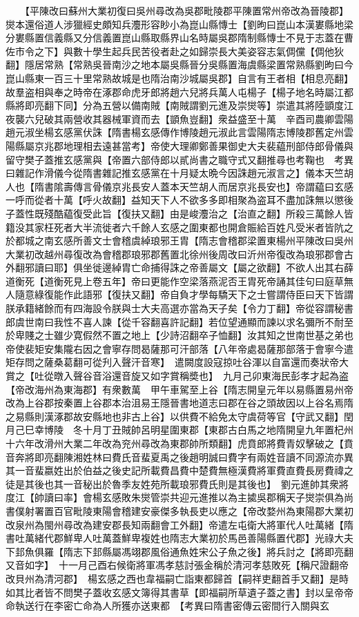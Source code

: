 　　【平陳改曰蘇州大業初復曰吳州尋改為吳郡毗陵郡平陳置常州帝改為晉陵郡】爕本還俗道人涉獵經史頗知兵灋形容眇小為崑山縣慱士【劉昫曰崑山本漢婁縣地梁分婁縣置信義縣又分信義置崑山縣取縣界山名時屬吳郡隋制縣慱士不見于志蓋在曹佐市令之下】與數十學生起兵民苦役者赴之如歸崇長大美姿容志氣倜儻【倜他狄翻】隱居常熟【常熟吳晉南沙之地本屬吳縣晉分吳縣置海虞縣梁置常熟縣劉昫曰今崑山縣東一百三十里常熟故城是也隋治南沙城屬吳郡】自言有王者相【相息亮翻】故羣盗相與奉之時帝在涿郡命虎牙郎將趙六兒將兵萬人屯楊子【楊子地名時屬江都縣將即亮翻下同】分為五營以備南賊【南賊謂劉元進及崇爕等】崇遣其將陸顗度江夜襲六兒破其兩營收其器械軍資而去【顗魚豈翻】衆益盛至十萬　辛酉司農卿雲陽趙元淑坐楊玄感黨伏誅【隋書楊玄感傳作博陵趙元淑此言雲陽隋志博陵郡舊定州雲陽縣屬京兆郡地理相去遠甚當考】帝使大理卿鄭善果御史大夫裴藴刑部侍郎骨儀與留守樊子蓋推玄感黨與【帝置六部侍郎以貳尚書之職守式又翻推尋也考鞠也　考異曰雜記作滑儀今從隋書雜記推玄感黨在十月疑太晩今因誅趙元淑言之】儀本天竺胡人也【隋書隂壽傳言骨儀京兆長安人蓋本天竺胡人而居京兆長安也】帝謂藴曰玄感一呼而從者十萬【呼火故翻】益知天下人不欲多多即相聚為盗耳不盡加誅無以懲後子蓋性既殘酷藴復受此旨【復扶又翻】由是峻灋治之【治直之翻】所殺三萬餘人皆籍没其家枉死者大半流徙者六千餘人玄感之圍東都也開倉賑給百姓凡受米者皆阬之於都城之南玄感所善文士會稽虞綽琅邪王胄【隋志會稽郡梁置東楊州平陳改曰吳州大業初改越州尋復改為會稽郡琅邪郡舊置北徐州後周改曰沂州帝復改為琅邪郡會古外翻邪讀曰耶】俱坐徙邊綽胄亡命捕得誅之帝善屬文【屬之欲翻】不欲人出其右薛道衡死【道衡死見上卷五年】帝曰更能作空梁落燕泥否王胄死帝誦其佳句曰庭草無人隨意綠復能作此語邪【復扶又翻】帝自負才學每驕天下之士嘗謂侍臣曰天下皆謂朕承籍緒餘而有四海設令朕與士大夫高選亦當為天子矣【令力丁翻】帝從容謂秘書郎虞世南曰我性不喜人諫【從千容翻喜許記翻】若位望通顯而諫以求名彌所不耐至於卑賤之士雖少寛假然不置之地上【少詩沼翻卒子恤翻】汝其知之世南世基之弟也　帝使裴矩安集隴右因之會寧存問曷薩那可汗部落【八年帝處曷薩那部落于會寧今遣矩存問之薩桑葛翻可從刋入聲汗音寒】　遣闕度設寇掠吐谷渾以自富還而奏狀帝大賞之【吐從暾入聲谷音浴還音旋又如字賞稱奬也】　九月己卯東海民彭孝才起為盗【帝改海州為東海郡】有衆數萬　甲午車駕至上谷【隋志開皇元年以易縣置易州帝改為上谷郡按秦置上谷郡本治沮易王隱晉書地道志曰郡在谷之頭故因以上谷名焉隋之易縣則漢涿郡故安縣地也非古上谷】以供費不給免太守虞荷等官【守武又翻】閏月己巳幸博陵　冬十月丁丑賊帥呂明星圍東郡【東郡古白馬之地隋開皇九年置杞州十六年改滑州大業二年改為兖州尋改為東郡帥所類翻】虎賁郎將費青奴擊破之【賁音奔將即亮翻陳湘姓林曰費氏音蜚夏禹之後趙明誠曰費字有兩姓音讀不同源流亦異其一音蜚嬴姓出於伯益之後史記所載費昌費中楚費無極漢費將軍費直費長房費禕之徒是其後也其一音秘出於魯季友姓苑所載琅邪費氏則是其後也】　劉元進帥其衆將度江【帥讀曰率】會楊玄感敗朱爕管崇共迎元進推以為主㨿吳郡稱天子爕崇俱為尚書僕射署置百官毗陵東陽會稽建安豪傑多執長吏以應之【帝改婺州為東陽郡大業初改泉州為閩州尋改為建安郡長知兩翻會工外翻】帝遣左屯衛大將軍代人吐萬緒【隋書吐萬緒代郡鮮卑人吐萬蓋鮮卑複姓也隋志大業初於馬邑善陽縣置代郡】光祿大夫下邽魚俱羅【隋志下邽縣屬馮翊郡風俗通魚姓宋公子魚之後】將兵討之【將即亮翻又音如字】　十一月己酉右候衛將軍馮孝慈討張金稱於清河孝慈敗死【稱尺證翻帝改貝州為清河郡】　楊玄感之西也韋福嗣亡詣東都歸首【嗣祥吏翻首手又翻】是時如其比者皆不問樊子蓋收玄感文簿得其書草【即福嗣所草遺子蓋之書】封以呈帝帝命執送行在李密亡命為人所獲亦送東都　【考異曰隋書密傳云密間行入關與玄
